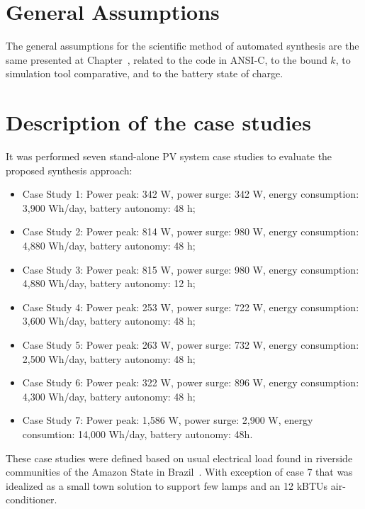 \section{General Assumptions}

The general assumptions for the scientific method of automated synthesis are the same presented at Chapter~, related to the code in ANSI-C, to the bound $k$, to simulation tool comparative, and to the battery state of charge.

\section{Description of the case studies} 

It was performed seven stand-alone PV system case studies to evaluate the proposed synthesis approach: 

\begin{itemize}
\item Case Study 1: Power peak: 342 W, power surge: 342 W, energy consumption: 3,900 Wh/day, battery autonomy: 48 h;
\item Case Study 2: Power peak: 814 W, power surge: 980 W, energy consumption: 4,880 Wh/day, battery autonomy: 48 h;
\item Case Study 3: Power peak: 815 W, power surge: 980 W, energy consumption: 4,880 Wh/day, battery autonomy: 12 h;
\item Case Study 4: Power peak: 253 W, power surge: 722 W, energy consumption: 3,600 Wh/day, battery autonomy: 48 h;
\item Case Study 5: Power peak: 263 W, power surge: 732 W, energy consumption: 2,500 Wh/day, battery autonomy: 48 h;
\item Case Study 6: Power peak: 322 W, power surge: 896 W, energy consumption: 4,300 Wh/day, battery autonomy: 48 h;
\item Case Study 7: Power peak: 1,586 W, power surge: 2,900 W, energy consumtion: 14,000 Wh/day, battery autonomy: 48h.
\end{itemize}

These case studies were defined based on usual electrical load found in riverside communities of the Amazon State in Brazil~\cite{TrindadeCordeiro19, Agrener2013}. With exception of case 7 that was idealized as a small town solution to support few lamps and an 12 kBTUs air-conditioner.

